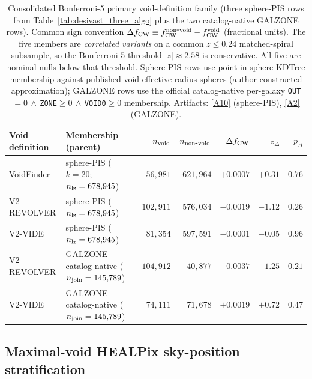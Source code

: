 \documentclass[aps,prd,twocolumn,superscriptaddress,showpacs,preprintnumbers,nofootinbib,longbibliography,floatfix]{revtex4-2}
\newcommand{\repoBase}{https://github.com/Hubify-Projects/bigbounce/blob/main}
\begin{document}
\begin{table}[ht]
\caption{Consolidated Bonferroni-5 primary void-definition family
(three sphere-PIS rows from Table~\ref{tab:desivast_three_algo} plus the
two catalog-native GALZONE rows). Common sign convention
$\Delta f_{\rm CW} \equiv f_{\rm CW}^{\rm non\mbox{-}void} -
f_{\rm CW}^{\rm void}$ (fractional units). The five members are
\emph{correlated variants} on a common $z\!\le\!0.24$ matched-spiral
subsample, so the Bonferroni-5 threshold $|z|\!\approx\!2.58$ is
conservative. All five are nominal nulls below that threshold. Sphere-PIS
rows use point-in-sphere KDTree membership against published
void-effective-radius spheres (author-constructed approximation);
GALZONE rows use the official catalog-native per-galaxy
\texttt{OUT}$=0\,\wedge\,$\texttt{ZONE}$\ge0\,\wedge\,$\texttt{VOID0}$\ge0$
membership. Artifacts:
\href{\repoBase/pipelines/p5\_desi\_chirality/outputs/17\_v0151\_closure\_recomputes.json}{[A10]}
(sphere-PIS),
\href{\repoBase/pipelines/p5\_desi\_chirality/outputs/30\_ext4\_galzone\_complement\_contrasts.json}{[A2]}
(GALZONE).}
\label{tab:bonferroni5_family}
\begin{ruledtabular}
\begin{tabular}{llrrrrr}
Void definition & Membership (parent) & $n_{\rm void}$ &
$n_{\rm non\mbox{-}void}$ & $\Delta f_{\rm CW}$ & $z_\Delta$ &
$p_\Delta$ \\
\hline
VoidFinder & sphere-PIS ($k\!=\!20$; $n_{\rm lz}=678{,}945$) & $56{,}981$ & $621{,}964$ & $+0.0007$ & $+0.31$ & $0.76$ \\
V2-REVOLVER & sphere-PIS ($n_{\rm lz}=678{,}945$) & $102{,}911$ & $576{,}034$ & $-0.0019$ & $-1.12$ & $0.26$ \\
V2-VIDE & sphere-PIS ($n_{\rm lz}=678{,}945$) & $81{,}354$ & $597{,}591$ & $-0.0001$ & $-0.05$ & $0.96$ \\
V2-REVOLVER & GALZONE catalog-native ($n_{\rm join}=145{,}789$) & $104{,}912$ & $40{,}877$ & $-0.0037$ & $-1.25$ & $0.21$ \\
V2-VIDE & GALZONE catalog-native ($n_{\rm join}=145{,}789$) & $74{,}111$ & $71{,}678$ & $+0.0019$ & $+0.72$ & $0.47$ \\
\end{tabular}
\end{ruledtabular}
\end{table}

\subsection{Maximal-void HEALPix sky-position stratification}\label{sec:desivast_maximal_healpix}
\end{document}
